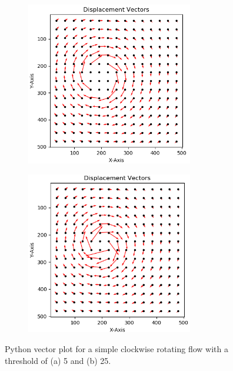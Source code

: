 \documentclass[letterpaper,12pt]{article}
\begin{document}
\begin{figure}[h]
    \centering
    \begin{subfigure}[b]{0.45\textwidth}
    	\centering
        \includegraphics[width=0.8\textwidth]{Python_Vel_Vec_Thresh5.PNG}
        \caption{}
        \label{fig:Python_Vel_Vec_Thresh5}
    \end{subfigure}
    \begin{subfigure}[b]{0.45\textwidth}
    	\centering
        \includegraphics[width=0.8\textwidth]{Python_Vel_Vec_Thresh25.PNG}
        \caption{}
        \label{fig:Python_Vel_Vec_Thresh25}
    \end{subfigure}
 	
    \caption{Python vector plot for a simple clockwise rotating flow with a threshold of (a) 5 and (b) 25.}
    \label{fig:Python_Vel_Vec}
\end{figure}
\end{document}
